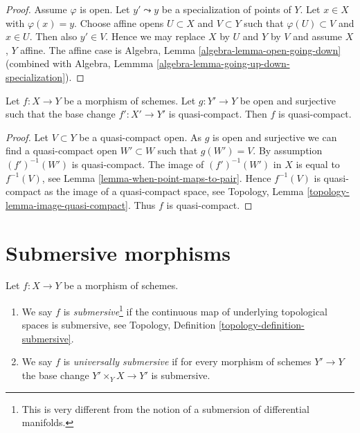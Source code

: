 \begin{proof}
Assume $\varphi$ is open.
Let $y' \leadsto y$ be a specialization of points of $Y$.
Let $x \in X$ with $\varphi(x) = y$.
Choose affine opens $U \subset X$ and $V \subset Y$ such that
$\varphi(U) \subset V$ and $x \in U$. Then also $y' \in V$. Hence we
may replace $X$ by $U$ and $Y$ by $V$ and assume $X$, $Y$ affine.
The affine case is
Algebra, Lemma \ref{algebra-lemma-open-going-down}
(combined with
Algebra, Lemmma \ref{algebra-lemma-going-up-down-specialization}).
\end{proof}

\begin{lemma}
\label{lemma-descent-quasi-compact}
Let $f : X \to Y$ be a morphism of schemes.
Let $g : Y' \to Y$ be open and surjective such that the base change
$f' : X' \to Y'$ is quasi-compact. Then $f$ is quasi-compact.
\end{lemma}

\begin{proof}
Let $V \subset Y$ be a quasi-compact open. As $g$ is open and surjective
we can find a quasi-compact open $W' \subset W$ such that $g(W') = V$.
By assumption $(f')^{-1}(W')$ is quasi-compact. The image of
$(f')^{-1}(W')$ in $X$ is equal to $f^{-1}(V)$, see
Lemma \ref{lemma-when-point-maps-to-pair}.
Hence $f^{-1}(V)$ is quasi-compact as the image of a quasi-compact space, see
Topology, Lemma \ref{topology-lemma-image-quasi-compact}.
Thus $f$ is quasi-compact.
\end{proof}





\section{Submersive morphisms}
\label{section-submersive}

\begin{definition}
\label{definition-submersive}
Let $f : X \to Y$ be a morphism of schemes.
\begin{enumerate}
\item We say $f$ is {\it submersive}\footnote{This is very different
from the notion of a submersion of differential manifolds.}
if the continuous map of underlying topological spaces is submersive, see
Topology, Definition \ref{topology-definition-submersive}.
\item We say $f$ is {\it universally submersive} if for every
morphism of schemes $Y' \to Y$ the base change
$Y' \times_Y X \to Y'$ is submersive.
\end{enumerate}
\end{definition}

